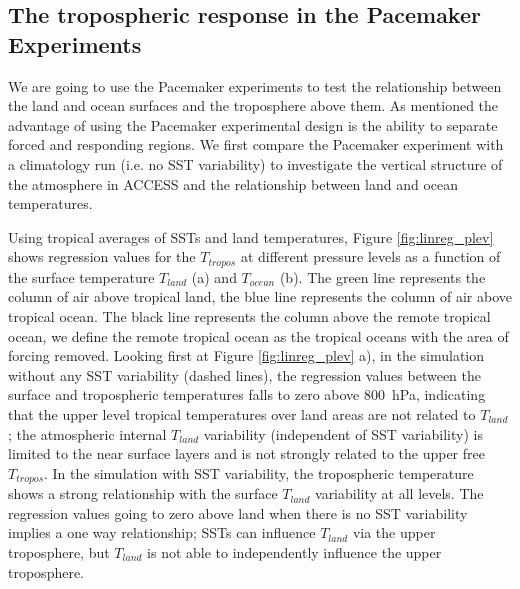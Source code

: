 \subsection{The tropospheric response in the Pacemaker Experiments}
\label{sec:pace_trop}

We are going to use the Pacemaker experiments to test the relationship between 
the land and ocean surfaces and the troposphere above them. As mentioned the 
advantage of using the Pacemaker experimental design is the ability to separate 
forced and responding regions.  We first compare the Pacemaker experiment with a 
climatology run (i.e. no SST variability) to investigate the vertical structure 
of the atmosphere in ACCESS and the relationship between land and ocean 
temperatures.

Using tropical averages of SSTs and land temperatures, Figure 
\ref{fig:linreg_plev} shows regression values for the $T_{tropos}$ at different 
pressure levels as a function of the surface temperature $T_{land}$ (a) and 
$T_{ocean}$ (b). The green line represents the column of air above tropical 
land, the blue line represents the column of air above tropical ocean. The black 
line represents the column above the remote tropical ocean, we define the remote 
tropical ocean as the tropical oceans with the area of forcing removed.  Looking 
first at Figure \ref{fig:linreg_plev} a), in the simulation without any SST 
variability (dashed lines), the regression values between the surface and 
tropospheric temperatures falls to zero above \SI{800}{\hecto\pascal}, 
indicating that the upper level tropical temperatures over land areas are not 
related to $T_{land}$; the atmospheric internal $T_{land}$ variability 
(independent of SST variability) is limited to the near surface layers and is 
not strongly related to the upper free $T_{tropos}$. In the simulation with SST 
variability, the tropospheric temperature shows a strong relationship with the 
surface $T_{land}$ variability at all levels. The regression values going to 
zero above land when there is no SST variability implies a one way relationship; 
SSTs can influence $T_{land}$ via the upper troposphere, but $T_{land}$ is not 
able to independently influence the upper troposphere.

